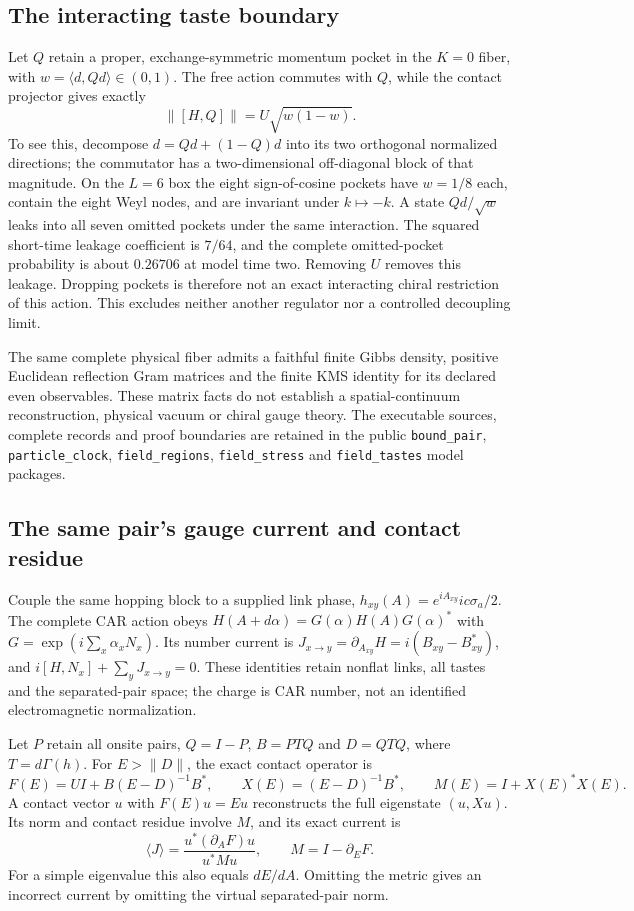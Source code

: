 \subsection{The interacting taste boundary}
Let $Q$ retain a proper, exchange-symmetric momentum pocket in the $K=0$
fiber, with $w=\langle d,Qd\rangle\in(0,1)$. The free action commutes
with $Q$, while the contact projector gives exactly
\[
 \|[H,Q]\|=U\sqrt{w(1-w)}.
\]
To see this, decompose $d=Qd+(1-Q)d$ into its two orthogonal normalized
directions; the commutator has a two-dimensional off-diagonal block of
that magnitude. On the $L=6$ box the eight sign-of-cosine pockets have
$w=1/8$ each, contain the eight Weyl nodes, and are invariant under
$k\mapsto-k$. A state $Qd/\sqrt w$ leaks into all seven omitted pockets
under the same interaction. The squared short-time leakage coefficient is
$7/64$, and the complete omitted-pocket probability is about $0.26706$ at
model time two. Removing $U$ removes this leakage. Dropping pockets is
therefore not an exact interacting chiral restriction of this action.
This excludes neither another regulator nor a controlled decoupling limit.

The same complete physical fiber admits a faithful finite Gibbs density,
positive Euclidean reflection Gram matrices and the finite KMS identity
for its declared even observables. These matrix facts do not establish
a spatial-continuum reconstruction, physical vacuum or chiral gauge theory.
The executable sources, complete records and proof boundaries are retained
in the public \texttt{bound\_pair}, \texttt{particle\_clock},
\texttt{field\_regions}, \texttt{field\_stress} and
\texttt{field\_tastes} model packages.

\subsection{The same pair's gauge current and contact residue}

Couple the same hopping block to a supplied link phase,
$h_{xy}(A)=e^{iA_{xy}}ic\sigma_a/2$. The complete CAR action obeys
$H(A+d\alpha)=G(\alpha)H(A)G(\alpha)^*$ with
$G=\exp(i\sum_x\alpha_xN_x)$. Its number current is
$J_{x\to y}=\partial_{A_{xy}}H=i(B_{xy}-B_{xy}^*)$, and
$i[H,N_x]+\sum_yJ_{x\to y}=0$. These identities retain nonflat links,
all tastes and the separated-pair space; the charge is CAR number, not an
identified electromagnetic normalization.

Let $P$ retain all onsite pairs, $Q=I-P$, $B=PTQ$ and $D=QTQ$, where
$T=d\Gamma(h)$. For $E>\|D\|$, the exact contact operator is
\[
 F(E)=UI+B(E-D)^{-1}B^*,\qquad
 X(E)=(E-D)^{-1}B^*,\qquad M(E)=I+X(E)^*X(E).
\]
A contact vector $u$ with $F(E)u=Eu$ reconstructs the full eigenstate
$(u,Xu)$. Its norm and contact residue involve $M$, and its exact current is
\[
 \langle J\rangle
 =\frac{u^*(\partial_A F)u}{u^*M u},\qquad
 M=I-\partial_EF.
\]
For a simple eigenvalue this also equals $dE/dA$. Omitting the metric gives
an incorrect current by omitting the virtual separated-pair norm.

